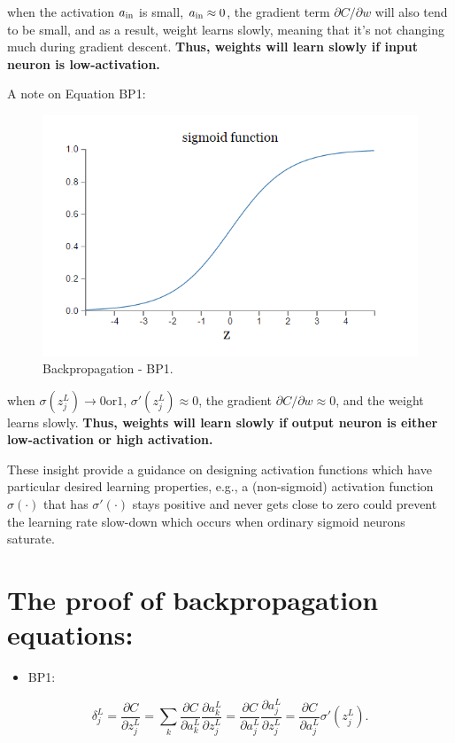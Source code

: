 \documentclass[]{book}
\providecommand{\tightlist}{%
  \setlength{\itemsep}{0pt}\setlength{\parskip}{0pt}}
\begin{document}
when the activation \(a_{\rm in}\) is small, \(a_{\rm in} \approx 0\),
the gradient term \(\partial C / \partial w\) will also tend to be
small, and as a result, weight learns slowly, meaning that it's not
changing much during gradient descent. \textbf{Thus, weights will learn
slowly if input neuron is low-activation.}

A note on Equation BP1:

\begin{figure}

{\centering \includegraphics[width=0.5\linewidth]{fig/02_sigmoid} 

}

\caption{Backpropagation - BP1.}\label{fig:bkpg-eq1}
\end{figure}

when \(\sigma(z^L_j) \to 0 \mbox{or} 1\), \(\sigma'(z^L_j) \approx 0\),
the gradient \(\partial C / \partial w \approx 0\), and the weight
learns slowly. \textbf{Thus, weights will learn slowly if output neuron
is either low-activation or high activation.}

These insight provide a guidance on designing activation functions which
have particular desired learning properties, e.g., a (non-sigmoid)
activation function \(\sigma(\cdot)\) that has \(\sigma'(\cdot)\) stays
positive and never gets close to zero could prevent the learning rate
slow-down which occurs when ordinary sigmoid neurons saturate.

\section{The proof of backpropagation
equations:}\label{the-proof-of-backpropagation-equations}

\begin{itemize}
\tightlist
\item
  BP1:
\end{itemize}

\begin{equation}  
\delta^L_j = \frac{\partial C}{\partial z^L_j} 
           = \sum_k \frac{\partial C}{\partial a^L_k} \frac{\partial a^L_k}{\partial z^L_j}
           = \frac{\partial C}{\partial a^L_j} \frac{\partial a^L_j}{\partial z^L_j} 
           = \frac{\partial C}{\partial a^L_j} \sigma'(z^L_j).
\end{equation}
\end{document}
